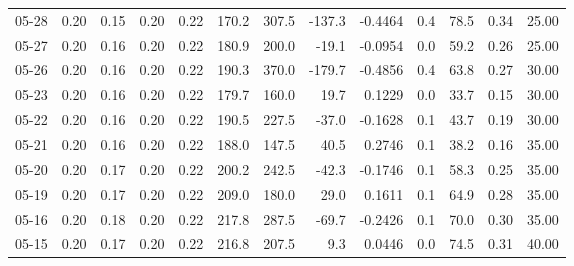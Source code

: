 \begin{threeparttable}
{\begin{tabular}{lrrrrrrrrrrrr}
  05-28 &          0.20 &          0.15 &          0.20 &        0.22 &               170.2 &               307.5 &     -137.3 &      -0.4464 &                 0.4 &             78.5 &            0.34 &                  25.00 \\
  05-27 &          0.20 &          0.16 &          0.20 &        0.22 &               180.9 &               200.0 &      -19.1 &      -0.0954 &                 0.0 &             59.2 &            0.26 &                  25.00 \\
  05-26 &          0.20 &          0.16 &          0.20 &        0.22 &               190.3 &               370.0 &     -179.7 &      -0.4856 &                 0.4 &             63.8 &            0.27 &                  30.00 \\
  05-23 &          0.20 &          0.16 &          0.20 &        0.22 &               179.7 &               160.0 &       19.7 &       0.1229 &                 0.0 &             33.7 &            0.15 &                  30.00 \\
  05-22 &          0.20 &          0.16 &          0.20 &        0.22 &               190.5 &               227.5 &      -37.0 &      -0.1628 &                 0.1 &             43.7 &            0.19 &                  30.00 \\
  05-21 &          0.20 &          0.16 &          0.20 &        0.22 &               188.0 &               147.5 &       40.5 &       0.2746 &                 0.1 &             38.2 &            0.16 &                  35.00 \\
  05-20 &          0.20 &          0.17 &          0.20 &        0.22 &               200.2 &               242.5 &      -42.3 &      -0.1746 &                 0.1 &             58.3 &            0.25 &                  35.00 \\
  05-19 &          0.20 &          0.17 &          0.20 &        0.22 &               209.0 &               180.0 &       29.0 &       0.1611 &                 0.1 &             64.9 &            0.28 &                  35.00 \\
  05-16 &          0.20 &          0.18 &          0.20 &        0.22 &               217.8 &               287.5 &      -69.7 &      -0.2426 &                 0.1 &             70.0 &            0.30 &                  35.00 \\
  05-15 &          0.20 &          0.17 &          0.20 &        0.22 &               216.8 &               207.5 &        9.3 &       0.0446 &                 0.0 &             74.5 &            0.31 &                  40.00 \\

\end{tabular}}
\end{threeparttable}
